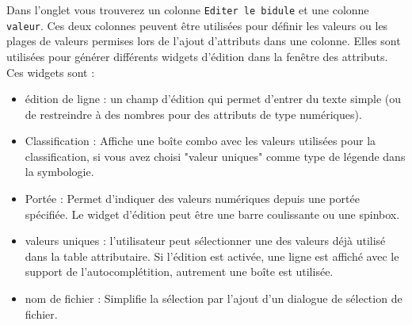 Dans l'onglet  vous trouverez un colonne \texttt{Editer le bidule} et une colonne \texttt{valeur}. Ces deux colonnes peuvent être utilisées pour définir les valeurs ou les plages de valeurs permises lors de l'ajout d'attributs dans une colonne. Elles sont utilisées pour générer différents widgets d'édition dans la fenêtre des attributs. Ces widgets sont :
\begin{itemize}
\begin{itemize}
\item édition de ligne : un champ d'édition qui permet d'entrer du texte simple (ou de restreindre à des nombres pour des attributs de type numériques).
\item Classification : Affiche une boîte combo avec les valeurs utilisées pour la classification, si vous avez choisi "valeur uniques" comme type de légende dans la symbologie.
\item Portée : Permet d'indiquer des valeurs numériques depuis une portée spécifiée. Le widget d'édition peut être une barre coulissante ou une spinbox.
\item valeurs uniques : l'utilisateur peut sélectionner une des valeurs déjà utilisé dans la table attributaire. Si l'édition est activée, une ligne est affiché avec le support de l'autocomplétition, autrement une boîte est utilisée.
\item nom de fichier : Simplifie la sélection par l'ajout d'un dialogue de sélection de fichier.

\end{itemize}
\end{itemize}
